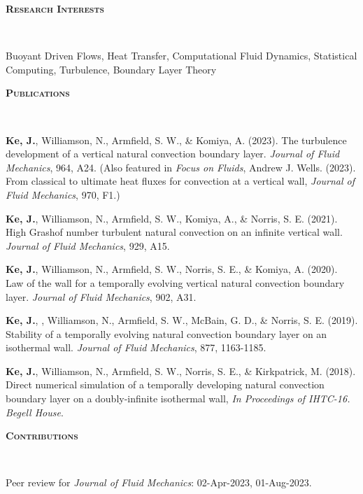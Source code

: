 \documentclass[letterpaper, 10pt]{article}
\newenvironment{changemargin}[2]{%
  \begin{list}{}{%
      \setlength{\topsep}{0pt}%
      \setlength{\leftmargin}{#1}%
      \setlength{\rightmargin}{#2}%
      \setlength{\listparindent}{\parindent}%
      \setlength{\itemindent}{\parindent}%
      \setlength{\parsep}{\parskip}%
    }%
  \item[]}{\end{list}
}
\newcommand{\lineover}{
  \begin{changemargin}{-0.05in}{-0.05in}
    \vspace*{-8pt}
    \hrulefill \\
    \vspace*{-2pt}
  \end{changemargin}
}
\newcommand{\header}[1]{
  \begin{changemargin}{-0.5in}{-0.5in}
    \textbf{\scshape{#1}}\\
    \lineover
  \end{changemargin}
}
\newenvironment{body} {
  \vspace*{-16pt}
  \begin{changemargin}{-0.25in}{-0.5in}
  }
  {\end{changemargin}
}
\begin{document}
\header{Research Interests}
Buoyant Driven Flows, Heat Transfer, Computational Fluid Dynamics, Statistical Computing, Turbulence, Boundary Layer Theory
\smallskip



\header{Publications}
\begin{body}
  \vspace{14pt}
  
  \textbf{Ke, J.}, Williamson, N., Armfield, S. W., \& Komiya, A. (2023). The turbulence development of a vertical natural convection boundary layer. \emph{Journal of Fluid Mechanics}, 964, A24. (Also featured in \emph{Focus on Fluids}, Andrew J. Wells. (2023). From classical to ultimate heat fluxes for convection at a vertical wall, \emph{Journal of Fluid Mechanics}, 970, F1.)
  
  \smallskip
    
  \textbf{Ke, J.}, Williamson, N., Armfield, S. W., Komiya, A., \& Norris, S. E. (2021).  High Grashof number turbulent natural convection on an infinite vertical wall. \emph{Journal of Fluid Mechanics}, 929, A15.
  
  \smallskip
  
  \textbf{Ke, J.}, Williamson, N., Armfield, S. W., Norris, S. E., \& Komiya, A.  (2020). Law of the wall for a temporally evolving vertical natural convection boundary layer. \emph{Journal of Fluid Mechanics}, 902, A31.
  
  \smallskip

  \textbf{Ke, J.}, , Williamson, N., Armfield, S. W., McBain, G. D., \& Norris, S. E. (2019). Stability of a temporally evolving natural convection boundary layer on an isothermal wall. \emph{Journal of Fluid Mechanics}, 877, 1163-1185.

  \smallskip

  \textbf{Ke, J.}, Williamson, N., Armfield, S. W., Norris, S. E., \& Kirkpatrick, M. (2018). Direct numerical simulation of a temporally developing natural convection boundary layer on a doubly-infinite isothermal wall, \emph{In Proceedings of IHTC-16. Begell House}. %
  

\end{body}
\smallskip


\header{Contributions}
\begin{body}
	\vspace{14pt}
	
	Peer review for \emph{Journal of Fluid Mechanics}:  02-Apr-2023, 01-Aug-2023.
\end{body}
\smallskip
\end{document}
